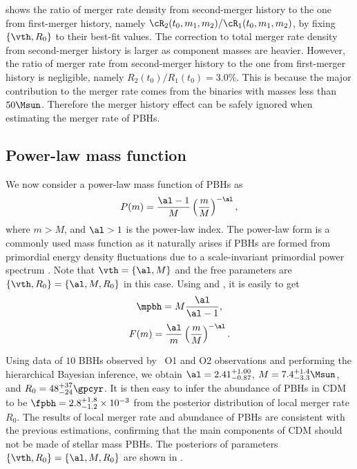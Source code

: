 \documentclass[twocolumn]{aastex631}
\def\({\left(}
\def\){\right)}
\def\e{\begin{equation}}
\def\q{\end{equation}}
\begin{document}
 shows the ratio of merger rate density from second-merger history
to the one from first-merger history, namely 
$\cR_2(t_0, m_1, m_2)/\cR_1(t_0, m_1, m_2)$, by fixing $\{\vth, R_0\}$ to their best-fit values.
The correction to total merger rate density from 
second-merger history is larger as component masses are heavier.
However, the ratio of merger rate from 
second-merger history to the one from first-merger history is negligible, namely
$R_2(t_0)/R_1(t_0) = 3.0\%$.
This is because the major contribution to the merger rate comes from the binaries with masses less than $50\Msun$.
Therefore the merger history effect can be safely ignored
when estimating the merger rate of PBHs.

\subsection{Power-law mass function}
We now consider a power-law mass function of PBHs as \cite{Carr:1975qj}
\e\label{power} 
    P(m) = \frac{\al-1}{M} \(\frac{m}{M}\)^{-\al},
\q
where $m>M$, and $\al>1$ is the power-law index. The power-law form is a commonly used mass function as it naturally arises if PBHs are formed from primordial energy density fluctuations due to a scale-invariant primordial power spectrum \cite{Carr:2016drx,Carr:2017jsz}.
Note that $\vth=\{\al, M\}$ and the free parameters are 
$\{\vth, R_0\} = \{\al, M, R_0\}$ in this case. 
Using  and , it is easily to get
\e
    \mpbh = M \frac{\al}{\al-1},
\q
\e 
    F(m) = \frac{\al}{m} \(\frac{m}{M}\)^{-\al}.
\q

Using data of $10$ BBHs observed by \lvc\ O1 and O2 observations and performing
the hierarchical Bayesian inference, we obtain $\al = 2.41^{+1.00}_{-0.87}$,
$M = 7.4^{+1.4}_{-3.3} \Msun$, and $R_0 = 48^{+37}_{-24} \gpcyr$.
It is then easy to infer the abundance of PBHs in CDM to be 
$\fpbh = 2.8^{+1.8}_{-1.2} \times 10^{-3}$ from the posterior distribution of local merger rate $R_0$.
The results of local merger rate and abundance of PBHs are consistent with
the previous estimations, confirming that the main components of CDM should
not be made of stellar mass PBHs.
The posteriors of parameters $\{\vth, R_0\} = \{\al, M, R_0\}$ are shown 
in .
\end{document}
